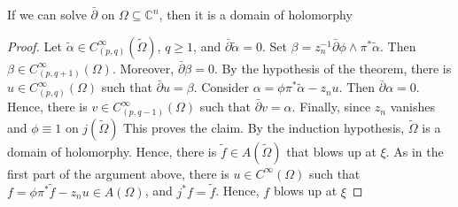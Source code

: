 \documentclass[../main.tex]{subfiles}
\begin{document}
\begin{theorem}
If we can solve $\bar\partial$ on $\Omega\subseteq\mathbb C^n$, then it is a domain of holomorphy
\end{theorem}

\begin{proof}
Let $\tilde\alpha\in C^\infty_{(p,q)}(\tilde\Omega)$, $q\geq1$, and $\bar\partial\tilde\alpha=0$. Set $\beta=z_n^{-1}\bar\partial\phi\wedge\pi^*\tilde\alpha$. Then $\beta\in C^\infty_{(p,q+1)}(\Omega)$. Moreover, $\bar\partial\beta=0$. By the hypothesis of the theorem, there is $u\in C^\infty_{(p,q)}(\Omega)$ such that $\bar\partial u=\beta$. Consider $\alpha=\phi\pi^*\tilde\alpha-z_nu$. Then $\bar\partial\alpha=0$. Hence, there is $v\in C^\infty_{(p,q-1)}(\Omega)$ such that $\bar\partial v=\alpha$. Finally, since $z_n$ vanishes and $\phi\equiv1$ on $j(\tilde\Omega)$
This proves the claim. By the induction hypothesis, $\tilde\Omega$ is a domain of holomorphy. Hence, there is $\tilde f\in A(\tilde\Omega)$ that blows up at $\xi$. As in the first part of the argument above, there is $u\in C^\infty(\Omega)$ such that $f=\phi\pi^*\tilde f-z_nu\in A(\Omega)$, and $j^*f=\tilde f$. Hence, $f$ blows up at $\xi$
\end{proof}
\end{document}
